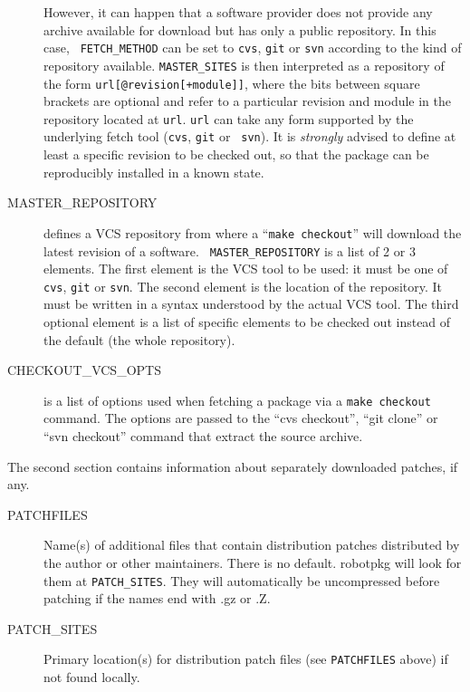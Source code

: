 \begin{description}
   However, it can happen that a software provider does not provide any archive
   available for download but has only a public repository. In this case, {\tt
   FETCH\_METHOD} can be set to {\tt cvs}, {\tt git} or {\tt svn} according to
   the kind of repository available. {\tt MASTER\_SITES} is then interpreted as
   a repository of the form {\tt url[@revision[+module]]}, where the bits
   between square brackets are optional and refer to a particular revision and
   module in the repository located at {\tt url}. {\tt url} can take any form
   supported by the underlying fetch tool ({\tt cvs}, {\tt git} or {\tt
   svn}). It is {\em strongly} advised to define at least a specific revision
   to be checked out, so that the package can be reproducibly installed in a
   known state.

   \smallbreak
   \item[MASTER\_REPOSITORY] defines a VCS repository from where a ``{\tt make
   checkout}'' will download the latest revision of a software. {\tt
   MASTER\_REPOSITORY} is a list of 2 or 3 elements. The first element is the
   VCS tool to be used: it must be one of {\tt cvs}, {\tt git} or {\tt svn}.
   The second element is the location of the repository. It must be written in
   a syntax understood by the actual VCS tool. The third optional element is a
   list of specific elements to be checked out instead of the default (the
   whole repository).

   \smallbreak
   \item[CHECKOUT\_VCS\_OPTS] is a list of options used when fetching a
   package via a {\tt make checkout} command. The options are passed to the
   ``cvs checkout'', ``git clone'' or ``svn checkout'' command that extract the
   source archive.
\end{description}

The second section contains information about separately downloaded patches, if any.

\begin{description}

   \item[PATCHFILES] Name(s) of additional files that contain distribution
   patches distributed by the author or other maintainers. There is no
   default. robotpkg will look for them at {\tt    PATCH\_SITES}. They will
   automatically be uncompressed before patching if    the names end with .gz
   or .Z.

   \smallbreak
   \item[PATCH\_SITES] Primary location(s) for distribution patch files (see
   {\tt PATCHFILES} above) if not found locally.

\end{description}

